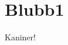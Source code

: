 \documentclass[12pt,a4paper]{article}
\begin{document}

\section*{Blubb1} 
\label{sec:blubb1}

Kaniner!


\end{document}
